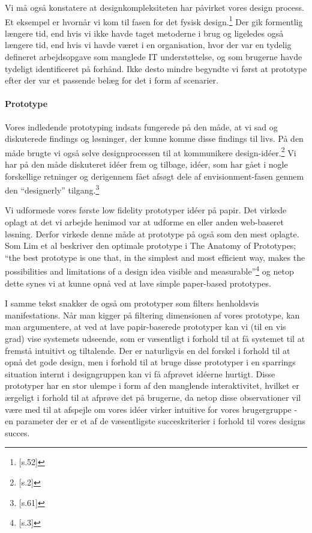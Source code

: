 Vi må også konstatere at designkompleksiteten har påvirket vores design process. Et eksempel er hvornår vi kom til fasen for det fysisk design.\footnote{\citep{Benyon}[s.52]} Der gik formentlig længere tid, end hvis vi ikke havde taget metoderne i brug og ligeledes også længere tid, end hvis vi havde været i en organisation, hvor der var en tydelig defineret arbejdsopgave som manglede IT understøttelse, og som brugerne havde tydeligt identificeret på forhånd. Ikke desto mindre begyndte vi først at prototype efter der var et passende belæg for det i form af scenarier.

\paragraph{Prototype}
Vores indledende prototyping indsats fungerede på den måde, at vi sad og diskuterede findings og løsninger, der kunne komme disse findings til livs. På den måde brugte vi også selve designprocessen til at kommunikere design-idéer.\footnote{\citep{Lim}[s.2]} Vi har på den måde diskuteret idéer frem og tilbage, idéer, som har gået i nogle forskellige retninger og derigennem fået afsøgt dele af envisionment-fasen gennem den “designerly” tilgang.\footnote{\citep{Stolterman}[s.61]}

Vi udformede vores første low fidelity prototyper idéer på papir. Det virkede oplagt at det vi arbejde henimod var at udforme en eller anden web-baseret løsning. Derfor virkede denne måde at prototype på også som den mest oplagte. Som Lim et al beskriver den optimale prototype i The Anatomy of Prototypes; “the best prototype is one that, in the simplest and most efﬁcient way, makes the possibilities and limitations of a design idea visible and measurable”\footnote{\citep{Lim}[s.3]} og netop dette synes vi at kunne opnå ved at lave simple paper-based prototypes. 

I samme tekst snakker de også om prototyper som filters henholdsvis manifestations. Når man kigger på filtering dimensionen af vores prototype, kan man argumentere, at ved at lave papir-baserede prototyper kan vi (til en vis grad) vise systemets udseende, som er væsentligt i forhold til at få systemet til at fremstå intuitivt og tiltalende. Der er naturligvis en del forskel i forhold til at opnå det gode design, men i forhold til at bruge disse prototyper i en sparrings situation internt i designgruppen kan vi få  afprøvet idéerne hurtigt. Disse prototyper har en stor ulempe i form af den manglende interaktivitet, hvilket er ærgeligt i forhold til at afprøve det på brugerne, da netop disse observationer vil være med til at afspejle om vores idéer virker intuitive for vores brugergruppe - en parameter der er et af de væsentligste succeskriterier i forhold til vores designs succes.

